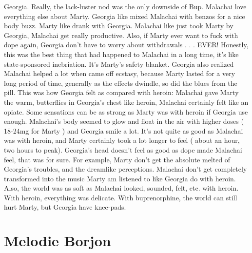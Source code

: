 \documentclass[12pt]{book}
\begin{document}
Georgia. Really, the lack-luster nod was the only downside of Bup. Malachai love everything else about Marty. Georgia like mixed Malachai with benzos for a nice body buzz. Marty like drank with Georgia. Malachai like just took Marty by Georgia, Malachai get really productive. Also, if Marty ever want to fuck with dope again, Georgia don't have to worry about withdrawals . . .  EVER! Honestly, this was the best thing that had happened to Malachai in a long time, it's like state-sponsored inebriation. It's Marty's safety blanket. Georgia also realized Malachai helped a lot when came off ecstasy, because Marty lasted for a very long period of time, generally as the effects dwindle, so did the blues from the pill. This was how Georgia felt as compared with heroin: Malachai gave Marty the warm, butterflies in Georgia's chest like heroin, Malachai certainly felt like an opiate. Some sensations can be as strong as Marty was with heroin if Georgia use enough. Malachai's body seemed to glow and float in the air with higher doses ( 18-24mg for Marty ) and Georgia smile a lot. It's not quite as good as Malachai was with heroin, and Marty certainly took a lot longer to feel ( about an hour, two hours to peak). Georgia's head doesn't feel as good as dope made Malachai feel, that was for sure. For example, Marty don't get the absolute melted of Georgia's troubles, and the dreamlike perceptions. Malachai don't get completely transformed into the music Marty am listened to like Georgia do with heroin. Also, the world was as soft as Malachai looked, sounded, felt, etc. with heroin. With heroin, everything was delicate. With buprenorphine, the world can still hurt Marty, but Georgia have knee-pads.



\chapter{Melodie Borjon}
\end{document}
